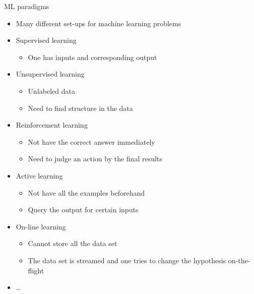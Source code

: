 \documentclass[aspectratio=169, xcolor=dvipsnames]{beamer}
\begin{document}
  \begin{frame}{ML paradigms}
    \begin{itemize}
      \item Many different set-ups for machine learning problems

      \item Supervised learning
        \begin{itemize}
          \item One has inputs and corresponding output
        \end{itemize}

      \item Unsupervised learning
        \begin{itemize}
          \item Unlabeled data

          \item Need to find structure in the data
        \end{itemize}

      \item Reinforcement learning
        \begin{itemize}
          \item Not have the correct answer immediately

          \item Need to judge an action by the final results
        \end{itemize}

      \item Active learning
        \begin{itemize}
          \item Not have all the examples beforehand

          \item Query the output for certain inputs
        \end{itemize}

      \item On-line learning
        \begin{itemize}
          \item Cannot store all the data set

          \item The data set is streamed and one tries to change the hypothesis on-the-flight
        \end{itemize}

      \item \ldots{}
    \end{itemize}
  \end{frame}
\end{document}
